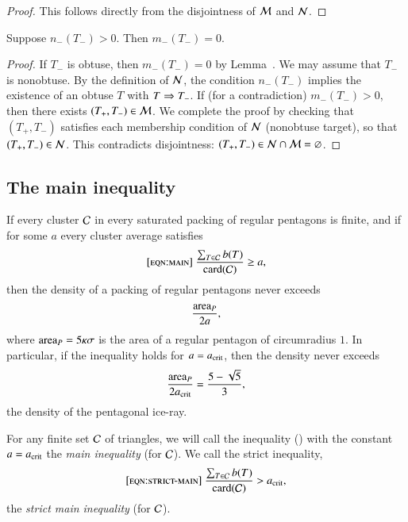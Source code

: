 \begin{proof} 
  This follows directly from the disjointness of $\mathcal M$ and $\mathcal N$.
\end{proof}

\begin{lemma}  
  Suppose $n_-(T_-)>0$.  Then $m_-(T_-)=0$.
\end{lemma}

\begin{proof}
  If $T_-$ is obtuse, then $m_-(T_-)=0$ by Lemma~.
  We may assume that $T_-$ is nonobtuse.  By the definition of $\mathcal N$,
  the condition $n_-(T_-)$ implies the existence of an obtuse $T$ with
  $T\Rightarrow T_-$.  If (for a contradiction) $m_-(T_-)>0$, then there
  exists $(T_+,T_-)\in\mathcal M$.  We complete the proof by checking that
  $(T_+,T_-)$ satisfies each membership condition of $\mathcal N$ (nonobtuse
  target), so that $(T_+,T_-)\in\mathcal N$.  This contradicts disjointness:
  $(T_+,T_-)\in \mathcal N\cap\mathcal M = \varnothing$.
\end{proof}



\subsection{The main inequality}

\begin{lemma}  
If  every cluster $\mathcal C$ in every saturated packing of regular
  pentagons is finite, and if for some $a$ every cluster average
  satisfies
\begin{equation}\libel{eqn:main}
\frac{\sum_{T\in \C} b(T)}{\card(\C)} \ge a,
\end{equation}
then the density of a packing of regular pentagons never exceeds 
\[
\frac{{\operatorname{area}}_P} {2 a},
\]
where ${\operatorname{area}}_P = 5\kappa\sigma$ is the area of a regular pentagon of
circumradius $1$.  In particular, if the inequality holds for
$a=a_\text{crit}$, then the density never exceeds
\[
\frac{{\operatorname{area}}_P}{2 a_\text{crit}} = \frac{5 - \sqrt{5}}{3},
\] %
the density of the pentagonal ice-ray.
\end{lemma}

For any finite set $\mathcal C$ of triangles, we will call the inequality
() with the constant $a=a_\text{crit}$ the {\it main inequality}
(for $\mathcal C$).  We call the strict inequality,
\begin{equation}\libel{eqn:strict-main}
\frac{\sum_{T\in \C} b(T)}{\card(\C)} > \acrit,
\end{equation}
the {\it strict main inequality} (for $\mathcal C$).


